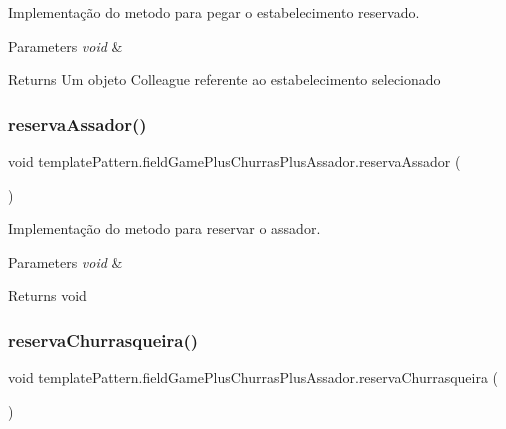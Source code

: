 Implementação do metodo para pegar o estabelecimento reservado. 


\begin{DoxyParams}{Parameters}
{\em void} & \\
\hline
\end{DoxyParams}
\begin{DoxyReturn}{Returns}
Um objeto Colleague referente ao estabelecimento selecionado 
\end{DoxyReturn}
\mbox{\label{classtemplate_pattern_1_1field_game_plus_churras_plus_assador_a1c7b861c1117a630c0ca949a9ce61e35}} 
\subsubsection{\texorpdfstring{reservaAssador()}{reservaAssador()}}
{\footnotesize\ttfamily void template\+Pattern.\+field\+Game\+Plus\+Churras\+Plus\+Assador.\+reserva\+Assador (\begin{DoxyParamCaption}{ }\end{DoxyParamCaption})}



Implementação do metodo para reservar o assador. 


\begin{DoxyParams}{Parameters}
{\em void} & \\
\hline
\end{DoxyParams}
\begin{DoxyReturn}{Returns}
void 
\end{DoxyReturn}
\mbox{\label{classtemplate_pattern_1_1field_game_plus_churras_plus_assador_a2115efe05f8e1d67050987d2f66345d5}} 
\subsubsection{\texorpdfstring{reservaChurrasqueira()}{reservaChurrasqueira()}}
{\footnotesize\ttfamily void template\+Pattern.\+field\+Game\+Plus\+Churras\+Plus\+Assador.\+reserva\+Churrasqueira (\begin{DoxyParamCaption}{ }\end{DoxyParamCaption})}



